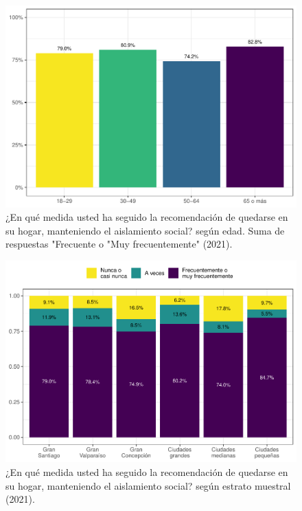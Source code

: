\documentclass[
  12pt,
  openany]{book}
\begin{document}
\begin{figure}

{\centering \includegraphics{reporte-elsoc_files/figure-latex/dist-edad-1} 

}

\caption{¿En qué medida usted ha seguido la recomendación de quedarse en su hogar, manteniendo el aislamiento social? según edad. Suma de respuestas "Frecuente o "Muy frecuentemente" (2021).}\label{fig:dist-edad}
\end{figure}

\begin{figure}

{\centering \includegraphics{reporte-elsoc_files/figure-latex/dist-estrato-1} 

}

\caption{¿En qué medida usted ha seguido la recomendación de quedarse en su hogar, manteniendo el aislamiento social? según estrato muestral (2021).}\label{fig:dist-estrato}
\end{figure}
\end{document}
